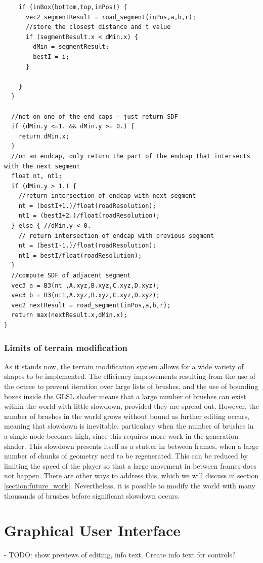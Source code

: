 \documentclass{article}
\begin{document}
\begin{lstlisting}
    if (inBox(bottom,top,inPos)) {
      vec2 segmentResult = road_segment(inPos,a,b,r);
      //store the closest distance and t value
      if (segmentResult.x < dMin.x) {
        dMin = segmentResult;
        bestI = i;
      }

    }
  }
    
  //not on one of the end caps - just return SDF
  if (dMin.y <=1. && dMin.y >= 0.) {
    return dMin.x;
  }
  //on an endcap, only return the part of the endcap that intersects with the next segment
  float nt, nt1;
  if (dMin.y > 1.) {
    //return intersection of endcap with next segment
    nt = (bestI+1.)/float(roadResolution);
    nt1 = (bestI+2.)/float(roadResolution);
  } else { //dMin.y < 0.
    // return intersection of endcap with previous segment
    nt = (bestI-1.)/float(roadResolution);
    nt1 = bestI/float(roadResolution);
  }
  //compute SDF of adjacent segment
  vec3 a = B3(nt ,A.xyz,B.xyz,C.xyz,D.xyz);
  vec3 b = B3(nt1,A.xyz,B.xyz,C.xyz,D.xyz);
  vec2 nextResult = road_segment(inPos,a,b,r);
  return max(nextResult.x,dMin.x);
}
\end{lstlisting}


\subsubsection{Limits of terrain modification}
\label{edit_limits}
As it stands now, the terrain modification system allows for a wide variety of shapes to be implemented. The efficiency improvements resulting from the use of the octree to prevent iteration over large lists of brushes, and the use of bounding boxes inside the GLSL shader means that a large number of brushes can exist within the world with little slowdown, provided they are spread out. However, the number of brushes in the world grows without bound as further editing occurs, meaning that slowdown is inevitable, particulary when the number of brushes in a single node becomes high, since this requires more work in the generation shader. This slowdown presents itself as a stutter in between frames, when a large number of chunks of geometry need to be regenerated. This can be reduced by limiting the speed of the player so that a large movement in between frames does not happen. There are other ways to address this, which we will discuss in section \ref{section:future_work}. Nevertheless, it is possible to modify the world with many thousands of brushes before significant slowdown occurs.
\section{Graphical User Interface}
 - TODO: show previews of editing, info text. Create info text for controls?
 
\end{document}
